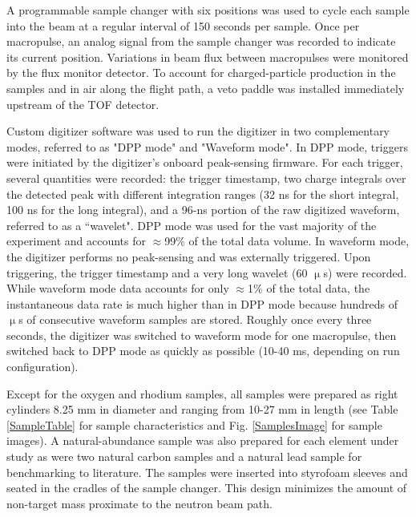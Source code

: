\documentclass[twocolumn,secnumarabic,amssymb, nobibnotes, aps, prl,
superscriptaddress, nobalancelastpage]{revtex4}
\begin{document}
A programmable sample changer with six positions
was used to cycle each sample into the beam at a regular interval of 150 seconds 
per sample. Once per macropulse, an analog signal from the sample changer was recorded to 
indicate its current position. Variations in beam flux 
between macropulses were monitored by the flux monitor detector. To account for
charged-particle production in the samples and in air along the flight path, a
veto paddle was installed immediately upstream of the TOF detector.

Custom digitizer software was used to run the 
digitizer in two complementary modes, referred to as "DPP mode" and "Waveform 
mode". In DPP mode, triggers were initiated by the digitizer's onboard
peak-sensing firmware. For each trigger, several quantities were recorded: the trigger 
timestamp, two charge integrals over the detected peak with different
integration ranges (32 ns for the short integral, 100 ns for the long integral),
and a 96-ns portion of the raw digitized waveform, referred to as a ``wavelet".
DPP mode was used for the vast majority of the 
experiment and accounts for $\approx$99\% of the total data volume. In waveform mode, 
the digitizer performs no peak-sensing and was externally triggered. Upon 
triggering, the trigger timestamp and a very long wavelet (60 $\upmu$s) 
were recorded. While waveform mode data accounts for only $\approx$1\% of the total data, 
the instantaneous data rate is much higher than in DPP 
mode because hundreds of $\upmu$s of consecutive waveform samples are 
stored. Roughly once every three seconds, the digitizer was switched to 
waveform mode for one macropulse, then switched back to DPP mode as quickly as
possible (10-40 ms, depending on run configuration).  

Except for the oxygen and rhodium samples, all samples were prepared as right
cylinders 8.25 mm in diameter and ranging from 10-27 mm in length (see
Table \ref{SampleTable} for sample characteristics and Fig. \ref{SamplesImage}
for sample images). A natural-abundance sample
was also prepared for each element under study as were two natural carbon
samples and a natural lead sample for benchmarking to literature. The samples
were inserted into styrofoam sleeves and seated in the cradles of the sample
changer. This design minimizes the amount of non-target mass proximate to the
neutron beam path.
\end{document}
